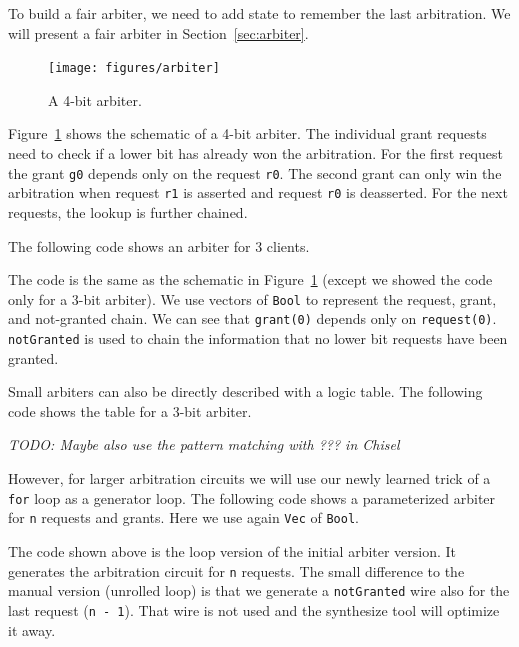 \documentclass[%
    10pt,
    headinclude, footexclude,
    openright, %
    notitlepage,
    cleardoubleempty,
    headsepline,
    pointlessnumbers,
    bibtotoc, idxtotoc,
    ]{scrbook}
\newcommand{\code}[1]{{\lstinline[basicstyle=\small\ttfamily]{#1}}}
\newcommand{\todo}[1]{{\emph{TODO: #1}}}
\begin{document}
To build a fair arbiter, we need to add state to remember the last arbitration.
We will present a fair %
arbiter in Section~\ref{sec:arbiter}.

\begin{figure}
  \centering
  \texttt{[image: figures/arbiter]}
  \caption{A 4-bit arbiter.}
  \label{fig:arbiter}
\end{figure}

Figure~\ref{fig:arbiter} shows the schematic of a 4-bit arbiter.
The individual grant requests need to check if a lower bit has already
won the arbitration. For the first request the grant \code{g0} depends only on the
request \code{r0}. The second grant can only win the arbitration when request \code{r1}
is asserted and request \code{r0} is deasserted. For the next requests, the lookup
is further chained.

The following code shows an arbiter for 3 clients.


\noindent The code is the same as the schematic in Figure~\ref{fig:arbiter}
(except we showed the code only for a 3-bit arbiter).
We use vectors of \code{Bool} to represent the request, grant, and not-granted chain.
We can see that \code{grant(0)} depends only on \code{request(0)}.
\code{notGranted} is used to chain the information that no lower bit requests
have been granted.

Small arbiters can also be directly described with a logic table. The following code
shows the table for a 3-bit arbiter.


\todo{Maybe also use the pattern matching with ??? in Chisel}

However, for larger arbitration circuits we will use our newly learned trick of
a \code{for} loop as a generator loop. The following code shows a parameterized
arbiter for \code{n} requests and grants. Here we use again \code{Vec} of \code{Bool}.


\noindent The code shown above is the loop version of the initial arbiter version.
It generates the arbitration circuit for \code{n} requests. The small difference to the
manual version (unrolled loop) is that we generate a \code{notGranted} wire also for the
last request (\code{n - 1}). That wire is not used and the synthesize tool will optimize it away.
\end{document}
